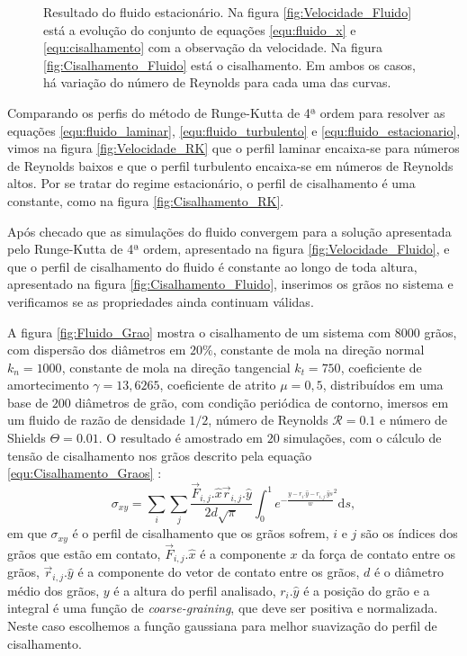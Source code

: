 \begin{figure}
\begin{minipage}{.45\linewidth}
        \label{fig:Cisalhamento_Fluido}
    \end{minipage}
    \caption{Resultado do fluido estacionário. Na figura \ref{fig:Velocidade_Fluido} está a evolução do conjunto de equações \ref{equ:fluido_x} e \ref{equ:cisalhamento} com a observação da velocidade. Na figura \ref{fig:Cisalhamento_Fluido} está o cisalhamento. Em ambos os casos, há variação do número de Reynolds para cada uma das curvas.}
    \label{fig:Simulacao_Fluido}
\end{figure}

    Comparando os perfis do método de Runge-Kutta de 4ª ordem para resolver as equações \ref{equ:fluido_laminar}, \ref{equ:fluido_turbulento} e \ref{equ:fluido_estacionario}, vimos na figura \ref{fig:Velocidade_RK} que o perfil laminar encaixa-se para números de Reynolds baixos e que o perfil turbulento encaixa-se em números de Reynolds altos. Por se tratar do regime estacionário, o perfil de cisalhamento é uma constante, como na figura \ref{fig:Cisalhamento_RK}.

    Após checado que as simulações do fluido convergem para a solução apresentada pelo Runge-Kutta de 4ª ordem, apresentado na figura \ref{fig:Velocidade_Fluido}, e que o perfil de cisalhamento do fluido é constante ao longo de toda altura, apresentado na figura \ref{fig:Cisalhamento_Fluido}, inserimos os grãos no sistema e verificamos se as propriedades ainda continuam válidas.

    A figura \ref{fig:Fluido_Grao} mostra o cisalhamento de um sistema com $8000$ grãos, com dispersão dos diâmetros em $20\%$, constante de mola na direção normal $k_{n} = 1000$, constante de mola na direção tangencial $k_{t} = 750$, coeficiente de amortecimento $\gamma = 13,6265$, coeficiente de atrito $\mu = 0,5$, distribuídos em uma base de $200$ diâmetros de grão, com condição periódica de contorno, imersos em um fluido de razão de densidade $1/2$, número de Reynolds $\mathcal{R} = 0.1$ e número de Shields $\Theta = 0.01$. O resultado é amostrado em $20$ simulações, com o cálculo de tensão de cisalhamento nos grãos descrito pela equação \ref{equ:Cisalhamento_Graos} \cite{Granular_Physics, Mechanical_properties_of_inclined_frictional_granular_layers}:
\begin{equation}
    \label{equ:Cisalhamento_Graos}
    \sigma_{xy} = \sum_{i} \sum_{j} \frac{\vec{F}_{i,j}.\hat{x} \vec{r}_{i,j}.\hat{y}}{2d\sqrt{\pi}} \int_{0}^{1} e^{-{\frac{y-r_{i}.\hat{y}-r_{i,j}.\hat{y}s}{w}}^{2}} \mathrm{d}s,
\end{equation}
em que $\sigma_{xy}$ é o perfil de cisalhamento que os grãos sofrem, $i$ e $j$ são os índices dos grãos que estão em contato, $\vec{F}_{i,j}.\hat{x}$ é a componente $x$ da força de contato entre os grãos, $\vec{r}_{i,j}.\hat{y}$ é a componente do vetor de contato entre os grãos, $d$ é o diâmetro médio dos grãos, $y$ é a altura do perfil analisado, $r_{i}.\hat{y}$ é a posição do grão e a integral é uma função de \textit{coarse-graining}, que deve ser positiva e normalizada. Neste caso escolhemos a função gaussiana para melhor suavização do perfil de cisalhamento.

